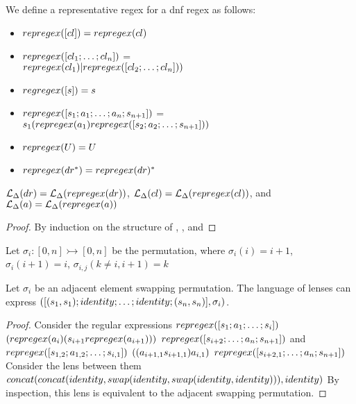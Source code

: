 \begin{definition}[repregex]
We define a representative regex for a dnf regex as follows:
\begin{itemize}
\item $repregex([cl])=repregex(cl)$
\item $repregex([cl_1 ; \ldots ; cl_n])$ =\\ $repregex(cl_1)| repregex([cl_2 ; \ldots ; cl_n]))$
\item $regregex([s]) = s$
\item $repregex([s_1 ; a_1 ; \ldots ; a_n ; s_{n+1}])$ =\\ $s_1 (repregex(a_1) repregex([s_2 ; a_2 ; \ldots ; s_{n+1}]))$
\item $repregex(U) = U$
\item $repregex(dr^*) = repregex(dr)^*$
\end{itemize}
\end{definition}

\begin{lemma}
\label{lem:repregex-equiv}
$\mathcal{L}_{\Delta}(dr)=\mathcal{L}_{\Delta}(repregex(dr))$,
$\mathcal{L}_{\Delta}(cl) = \mathcal{L}_{\Delta}(repregex(cl))$,
and $\mathcal{L}_{\Delta}(a) = \mathcal{L}_{\Delta}(repregex(a))$
\begin{proof}
By induction on the structure of \DNFRegex, \Clause, and \Atom
\end{proof}
\end{lemma}

\begin{definition}
Let $\sigma_{i} : [0,n] \rightarrowtail [0,n]$ be the permutation, where
$\sigma_{i}(i) = i+1$, $\sigma_{i}(i+1) = i$, $\sigma_{i,j}(k\neq i,i+1) = k$
\end{definition}

\begin{lemma}
Let $\sigma_{i}$ be an adjacent element swapping permutation.  The language of
lenses can express $([(s_1,s_1) ; identity ; \ldots ; identity ; (s_n,s_n)], \sigma_{i})$.
\begin{proof}
Consider the regular expressions $repregex([s_1;a_1; \ldots;s_i])$ $(repregex(a_i) (s_{i+1} repregex(a_{i+1})))$ $repregex([s_{i+2} ; \ldots ; a_{n} ; s_{n+1}])$ and 
$repregex([s_{1,2};a_{1,2}; \ldots;s_{i,1}])$ $((a_{i+1,1} s_{i+1,1})a_{i,1})$ $repregex([s_{i+2,1} ; \ldots ; a_{n} ; s_{n+1}])$
Consider the lens between them\\ $concat(concat(identity,swap(identity,swap(identity,identity))),identity)$
By inspection, this lens is equivalent to the adjacent swapping permutation.
\end{proof}
\end{lemma}

